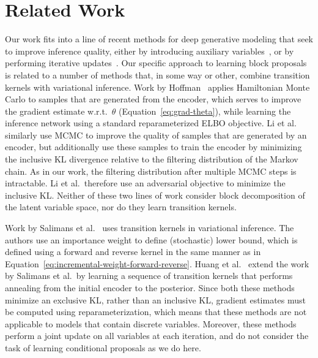 \documentclass{article}
\theoremstyle{definition}
\begin{document}
\section{Related Work}
Our work fits into a line of recent methods for deep generative modeling that seek to improve inference quality, either by introducing auxiliary variables~\cite{maaloe2016auxiliary, ranganath2016hierarchical}, or by performing iterative updates~\cite{ marino2018iterative}. Our specific approach to learning block proposals is related to a number of methods that, in some way or other, combine transition kernels with variational inference. Work by  Hoffman~\cite{hoffman2017learning} applies Hamiltonian Monte Carlo to samples that are generated from the encoder, which serves to improve the gradient estimate w.r.t.~$\theta$ (Equation~\ref{eq:grad-theta}), while learning the inference network using a standard reparameterized ELBO objective. 
Li et al.~\cite{li2017approximate} similarly use MCMC to improve the quality of samples that are generated by an encoder, but additionally use these samples to train the encoder by minimizing the inclusive KL divergence relative to the filtering distribution of the Markov chain. As in our work, the filtering distribution after multiple MCMC steps is intractable. Li et al.~therefore use an adversarial objective to minimize the inclusive KL. Neither of these two lines of work consider block decomposition of the latent variable space, nor do they learn transition kernels. 
 
Work by Salimans et al.~\cite{salimans2015markov} uses transition kernels in variational inference. The authors use an importance weight to define (stochastic) lower bound, which is defined using a forward and reverse kernel in the same manner as in Equation~\ref{eq:incremental-weight-forward-reverse}. Huang et al.~\cite{huang2018improving} extend the work by Salimans et al.~by learning a sequence of transition kernels that performs annealing from the initial encoder to the posterior. Since both these methods minimize an exclusive KL, rather than an inclusive KL, gradient estimates must be computed using reparameterization, which means that these methods are not applicable to models that contain discrete variables. Moreover, these methods perform a joint update on all variables at each iteration, and do not consider the task of learning conditional proposals as we do here.
\end{document}
